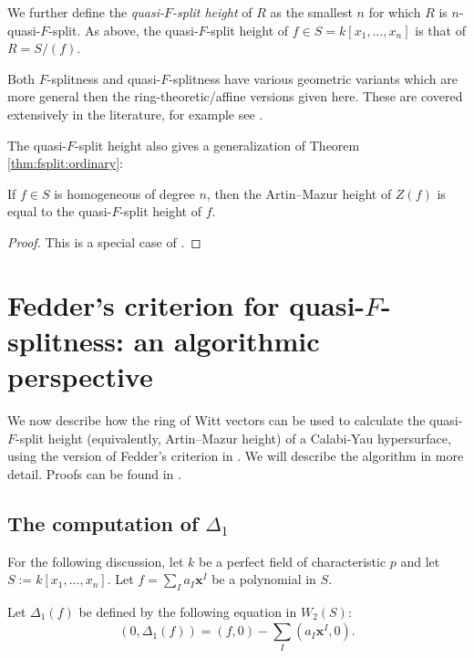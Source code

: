 We further define the \textit{quasi-\(F\)-split height} of \(R\) as the smallest \(n\) 
for which \(R\) is \(n\)-quasi-\(F\)-split.
As above, the quasi-\(F\)-split height of 
\(f \in S = k[x_{1}, \ldots, x_{n}]\) is that
of \(R = S / (f)\).

\begin{rmk}
	Both \(F\)-splitness and quasi-\(F\)-splitness have 
	various geometric
	variants which are more general then the 
	ring-theoretic/affine versions given here. 
	These are covered extensively in the literature, for example
	see \cite{kttwyy-2022-qfs-birat}.
\end{rmk}

The quasi-\(F\)-split height also gives a generalization
of Theorem \ref{thm:fsplit:ordinary}:

\begin{thm}
	If \(f \in S\) is homogeneous of degree \(n\),
	then the Artin--Mazur height of \(Z(f)\)
	is equal to the quasi-\(F\)-split height
	of \(f\).
\end{thm}

\begin{proof}
	This is a special case of 
	\cite[Theorem~4.5]{yobuko-2019-qfs-calabi-yau}.
\end{proof}

\section{Fedder's criterion for quasi-\(F\)-splitness: an algorithmic perspective}

We now describe how the ring of Witt vectors can be used to calculate the 
quasi-\(F\)-split height (equivalently, Artin--Mazur height) of a Calabi-Yau 
hypersurface, using the version of Fedder's criterion in \cite{kty-2022-fedder}.
We will describe the algorithm in more detail. Proofs can be
found in \cite{kty-2022-fedder}.

\subsection{The computation of \(\Delta_{1}\)}

For the following discussion, 
let \(k\) be a perfect field of characteristic \(p\) and 
let \(S := k[x_{1}, \ldots, x_{n}]\).
Let \(f = \sum_{I}^{} a_{I}\mathbf{x}^{I}\) be a polynomial in \(S\).

\begin{defn}
	Let \(\Delta_{1}(f)\)
	be defined by the following equation in \(W_{2}(S)\):
	\[
		(0, \Delta_{1}(f)) = (f,0) - \sum_{I}^{} (a_{I}\mathbf{x}^{I}, 0) 
	.\] 
\end{defn}

